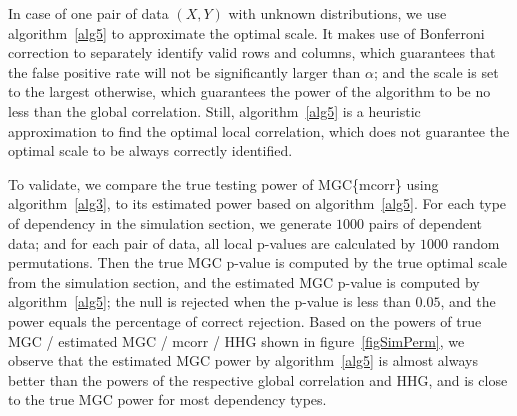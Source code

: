 \documentclass[11pt]{article}
\begin{document}
In case of one pair of data $(X,Y)$ with unknown distributions, we use algorithm~\ref{alg5} to approximate the optimal scale. It makes use of Bonferroni correction to separately identify valid rows and columns, which guarantees that the false positive rate will not be significantly larger than $\alpha$; and the scale is set to the largest otherwise, which guarantees the power of the algorithm to be no less than the global correlation. Still, algorithm~\ref{alg5} is a heuristic approximation to find the optimal local correlation, which does not guarantee the optimal scale to be always correctly identified.


To validate, we compare the true testing power of MGC\{mcorr\} using algorithm~\ref{alg3}, to its estimated power based on algorithm~\ref{alg5}. For each type of dependency in the simulation section, we generate $1000$ pairs of dependent data; and for each pair of data, all local p-values are calculated by $1000$ random permutations. Then the true MGC p-value is computed by the true optimal scale from the simulation section, and the estimated MGC p-value is computed by algorithm~\ref{alg5}; the null is rejected when the p-value is less than $0.05$, and the power equals the percentage of correct rejection. Based on the powers of true MGC / estimated MGC / mcorr / HHG shown in figure~\ref{figSimPerm}, we observe that the estimated MGC power by algorithm~\ref{alg5} is almost always better than the powers of the respective global correlation and HHG, and is close to the true MGC power for most dependency types. 
\end{document}
